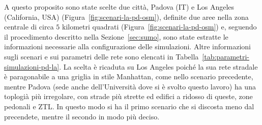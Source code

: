 A questo proposito sono state scelte due città, Padova (IT) e Los Angeles (California, USA) (Figura~\ref{fig:scenari-la-pd-osm}), definite due aree nella zona centrale di circa $5$ kilometri quadrati (Figura~\ref{fig:scenari-la-pd-osm})
e, seguendo il procedimento descritto nella Sezione~\ref{sec:sumo}, sono state estratte le informazioni necessarie alla configurazione delle simulazioni.
Altre informazioni sugli scenari e sui parametri delle rete sono elencati in Tabella~\ref{tab:parametri-simulazioni-pd-la}.
La scelta è ricaduta su Los Angeles poiché la sua rete stradale è paragonabile a una griglia in stile Manhattan, come nello scenario precedente,
mentre Padova (sede anche dell'Università dove si è svolto questo lavoro) ha una toplogià più irregolare, con strade più strette ed edifici a ridosso di queste,
zone pedonali e ZTL.
In questo modo si ha il primo scenario che si discosta meno dal precendete, mentre il secondo in modo più deciso.
%
